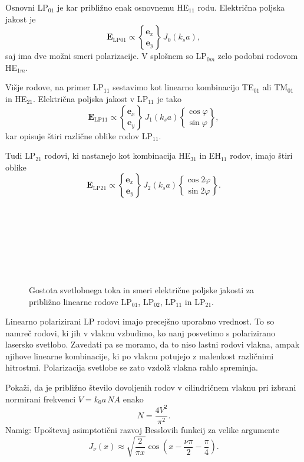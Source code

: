 Osnovni LP$_{01}$ je kar približno enak osnovnemu HE$_{11}$ rodu. Električna poljska jakost je 
\begin{equation}
\mathbf{E}_\mathrm{LP01} \propto { \mathbf{e}_x \brace \mathbf{e}_y} \, J_0(k_s a),
\end{equation}
saj ima dve možni smeri polarizacije. V splošnem so LP$_{0m}$ zelo podobni rodovom HE$_{1m}$. 

Višje rodove, na primer LP$_{11}$ sestavimo kot linearno kombinacijo 
TE$_{01}$ ali TM$_{01}$ in HE$_{21}$.
Električna poljska jakost v LP$_{11}$ je tako 
\begin{equation}
\mathbf{E}_\mathrm{LP11} \propto { \mathbf{e}_x \brace \mathbf{e}_y} \, J_1(k_s a)
{ \cos\varphi \brace \sin\varphi},
\end{equation}
kar opisuje štiri različne oblike rodov LP$_{11}$.

Tudi LP$_{21}$ rodovi, ki nastanejo kot kombinacija HE$_{31}$
in EH$_{11}$ rodov, imajo štiri oblike
\begin{equation}
\mathbf{E}_\mathrm{LP21} \propto { \mathbf{e}_x \brace \mathbf{e}_y} \, J_2(k_s a)
{ \cos 2\varphi \brace \sin 2\varphi}.
\end{equation}
\begin{figure}[h!]
\centering
\def\svgwidth{93truemm} 
 \\
\def\svgwidth{93truemm} 
 \\
\def\svgwidth{93truemm} 
 \\
\def\svgwidth{93truemm} 
 \\
\def\svgwidth{93truemm} 
 \\
\def\svgwidth{93truemm} 
 \\
\caption{Gostota svetlobnega toka in smeri električne poljske jakosti za približno linearne rodove
LP$_{01}$, LP$_{02}$, LP$_{11}$ in LP$_{21}$.}
\label{fig:LP}
\end{figure}
Linearno polarizirani LP rodovi imajo precejšno uporabno vrednost. To so 
namreč rodovi, ki jih v vlaknu vzbudimo, ko nanj posvetimo s polarizirano 
lasersko svetlobo. Zavedati pa se moramo, da to niso lastni rodovi vlakna, 
ampak njihove linearne kombinacije, ki po vlaknu potujejo z malenkost različnimi
hitrostmi. Polarizacija svetlobe se zato vzdolž vlakna rahlo spreminja.

\begin{definition}
Pokaži, da je približno število dovoljenih rodov v cilindričnem vlaknu pri 
izbrani normirani frekvenci $V = k_0a\, NA $ enako
\begin{equation} 
N = \frac{4 V^2}{\pi^2}.
\end{equation}
Namig: Upoštevaj asimptotični razvoj Besslovih funkcij za velike argumente
\begin{equation}
J_\nu(x) \approx \sqrt{\frac{2}{\pi x}}\cos\left(x - \frac{\nu \pi }{2}- \frac{\pi}{4}\right).
\end{equation}
\end{definition}

